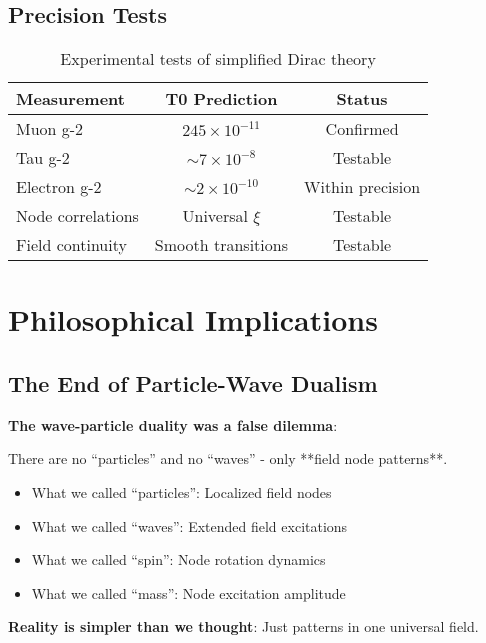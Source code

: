 \documentclass[12pt,a4paper]{article}
\newcommand{\xipar}{\xi}
\theoremstyle{definition}
\theoremstyle{remark}
\begin{document}
	\subsection{Precision Tests}
	
	\begin{table}[htbp]
		\centering
		\begin{tabular}{lcc}
			\toprule
			\textbf{Measurement} & \textbf{T0 Prediction} & \textbf{Status} \\
			\midrule
			Muon g-2 & $245 \times 10^{-11}$ & \checkmark Confirmed \\
			Tau g-2 & $\sim 7 \times 10^{-8}$ & Testable \\
			Electron g-2 & $\sim 2 \times 10^{-10}$ & Within precision \\
			Node correlations & Universal $\xipar$ & Testable \\
			Field continuity & Smooth transitions & Testable \\
			\bottomrule
		\end{tabular}
		\caption{Experimental tests of simplified Dirac theory}
		\label{tab:experimental_tests}
	\end{table}
	

	\section{Philosophical Implications}
	
	\subsection{The End of Particle-Wave Dualism}
	
	\begin{tcolorbox}[colback=purple!5!white,colframe=purple!75!black,title=Philosophical Revolution]
		\textbf{The wave-particle duality was a false dilemma}:
		
		There are no ``particles'' and no ``waves'' - only **field node patterns**.
		
		\begin{itemize}
			\item What we called ``particles'': Localized field nodes
			\item What we called ``waves'': Extended field excitations  
			\item What we called ``spin'': Node rotation dynamics
			\item What we called ``mass'': Node excitation amplitude
		\end{itemize}
		
		\textbf{Reality is simpler than we thought}: Just patterns in one universal field.
	\end{tcolorbox}
	
\end{document}
